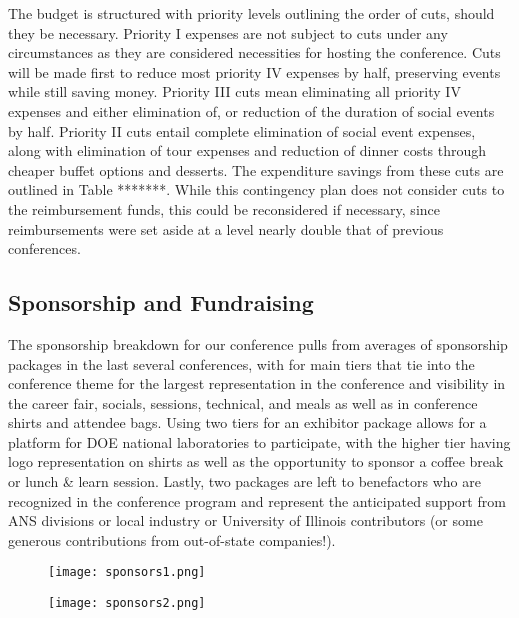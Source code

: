 The budget is structured with priority levels outlining the order of cuts, should they be necessary. Priority I expenses are not subject to cuts under any circumstances as they are considered necessities for hosting the conference. Cuts will be made first to reduce most priority IV expenses by half, preserving events while still saving money. Priority III cuts mean eliminating all priority IV expenses and either elimination of, or reduction of the duration of social events by half. Priority II cuts entail complete elimination of social event expenses, along with elimination of tour expenses and reduction of dinner costs through cheaper buffet options and desserts. The expenditure savings from these cuts are outlined in Table *******. While this contingency plan does not consider cuts to the reimbursement funds, this could be reconsidered if necessary, since reimbursements were set aside at a level nearly double that of previous conferences. \\

\subsection{Sponsorship and Fundraising}
The sponsorship breakdown for our conference pulls from averages of sponsorship packages in the last several conferences, with for main tiers that tie into the conference theme for the largest representation in the conference and visibility in the career fair, socials, sessions, technical, and meals as well as in conference shirts and attendee bags. Using two tiers for an exhibitor package allows for a platform for DOE national laboratories to participate, with the higher tier having logo representation on shirts as well as the opportunity to sponsor a coffee break or lunch \& learn session. Lastly, two packages are left to benefactors who are recognized in the conference program and represent the anticipated support from ANS divisions or local industry or University of Illinois contributors (or some generous contributions from out-of-state companies!). 

\vspace{1cm}

\begin{figure}[H]
	\centering
	\texttt{[image: sponsors1.png]}	
\end{figure} 

\begin{figure}[H]
	\centering
	\texttt{[image: sponsors2.png]}	
\end{figure} 

